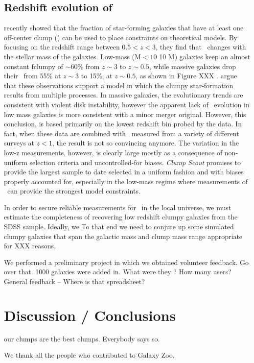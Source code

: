 \subsection{Redshift evolution of \fclump}
\cite{Guo2015} recently showed that the fraction of star-forming galaxies that have at least one off-center clump (\fclump) can be used to place constraints on theoretical models. By focusing on the redshift range between $0.5 <z<3$, they find that \fclump~changes with the stellar mass of the galaxies. Low-mass (M$<10$ 10 M) galaxies keep an almost constant fclumpy of $\sim$60\% from $z\sim3$ to $z\sim0.5$, while massive galaxies drop their \fclump~from 55\% at $z\sim3$ to 15\%, at $z\sim0.5$, as shown in Figure XXX \citep[adapted from][]{Guo2015}. \cite{Guo2015} argue that these observations support a model in which the clumpy star-formation results from multiple processes. In massive galaxies, the evolutionary trends are consistent with violent disk instability, however the apparent lack of \fclump~evolution in low mass galaxies is more consistent with a minor merger original. However, this conclusion, is based primarily on the lowest redshift bin probed by the \cite{Guo2015} data. In fact, when these data are combined with \fclump~measured from a variety of different surveys at $z<1$, the result is not so convincing anymore. The variation in the low-z measurements, however, is clearly large mostly as a consequence of non-uniform selection criteria and uncontrolled-for biases. \textit{Clump Scout} promises to provide the largest sample to date selected in a uniform fashion and with biases properly accounted for, especially in the low-mass regime where measurements of \fclump~can provide the strongest model constraints.

In order to secure reliable measurements for \fclump~in the local universe, we must estimate the completeness of recovering low redshift clumpy galaxies from the SDSS sample. Ideally, we  To that end we need to conjure up some simulated clumpy galaxies that span the galactic mass and clump mass range appropriate for XXX reasons. 


We performed a preliminary project in which we obtained volunteer feedback. Go over that. 1000 galaxies were added in. What were they ? How many users? General feedback -- Where is that spreadsheet? 

\section{Discussion / Conclusions}
our clumps are the best clumps. Everybody says so. 


We thank all the people who contributed to Galaxy Zoo. 